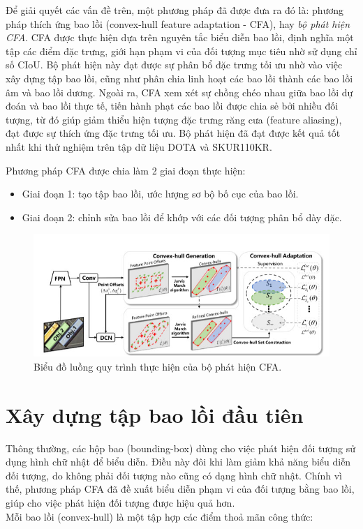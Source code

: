\documentclass[12pt,a4paper,openany,oneside]{report}
\begin{document}
Để giải quyết các vấn đề trên, một phương pháp đã được đưa ra đó là: phương pháp thích ứng bao lồi (convex-hull feature adaptation - CFA), hay \textit{bộ phát hiện CFA}. CFA được thực hiện dựa trên nguyên tắc biểu diễn bao lồi, định nghĩa một tập các điểm đặc trưng, giới hạn phạm vi của đối tượng mục tiêu nhờ sử dụng chỉ số CIoU. Bộ phát hiện này đạt được sự phân bổ đặc trưng tối ưu nhờ vào việc xây dựng tập bao lồi, cũng như phân chia linh hoạt các bao lồi thành các bao lồi âm và bao lồi dương. Ngoài ra, CFA xem xét sự chồng chéo nhau giữa bao lồi dự đoán và bao lồi thực tế, tiến hành phạt các bao lồi được chia sẻ bởi nhiều đối tượng, từ đó giúp giảm thiểu hiện tượng đặc trưng răng cưa (feature aliasing), đạt được sự thích ứng đặc trưng tối ưu. Bộ phát hiện đã đạt được kết quả tốt nhất khi thử nghiệm trên tập dữ liệu DOTA và SKUR110KR.

Phương pháp CFA được chia làm 2 giai đoạn thực hiện:
\begin{itemize}
	\item Giai đoạn 1: tạo tập bao lồi, ước lượng sơ bộ bố cục của bao lồi.
	\item Giai đoạn 2: chỉnh sửa bao lồi để khớp với các đối tượng phân bổ dày đặc.
\end{itemize}

\begin{figure}[ht!]
	\begin{center}
		\includegraphics[width=450px]{./work_flow_cfa.JPG}
		\caption{Biểu đồ luồng quy trình thực hiện của bộ phát hiện CFA.}
		\label{work_flow_cfa}
	\end{center}
\end{figure} 

\section{Xây dựng tập bao lồi đầu tiên}
Thông thường, các hộp bao (bounding-box) dùng cho việc phát hiện đối tượng sử dụng hình chữ nhật để biểu diễn. Điều này đôi khi làm giảm khả năng biểu diễn đối tượng, do không phải đối tượng nào cũng có dạng hình chữ nhật. Chính vì thế, phương pháp CFA đã đề xuất biểu diễn phạm vi của đối tượng bằng bao lồi, giúp cho việc phát hiện đối tượng được hiệu quả hơn.\\
Mỗi bao lồi (convex-hull) là một tập hợp các điểm thoả mãn công thức:
\end{document}
